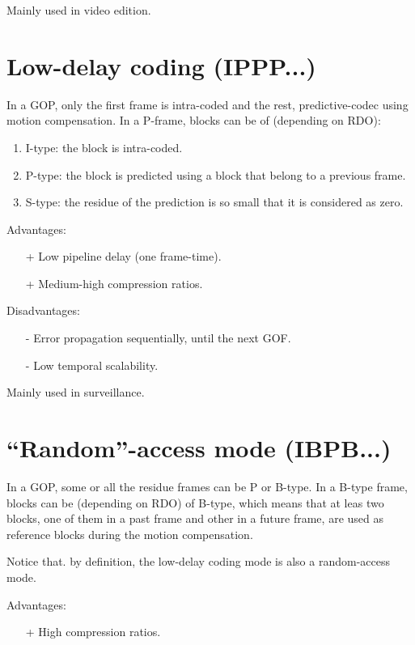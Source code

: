 Mainly used in video edition.

\section{Low-delay coding (IPPP...)}

In a GOP, only the first frame is intra-coded and the rest,
predictive-codec using motion compensation. In a P-frame, blocks can
be of (depending on RDO):
\begin{enumerate}
\item I-type: the block is intra-coded.
\item P-type: the block is predicted using a block that belong to a previous frame.
\item S-type: the residue of the prediction is so small that it is considered as zero.
\end{enumerate}

Advantages:
\begin{itemize}
\item [+] Low pipeline delay (one frame-time).
\item [+] Medium-high compression ratios.
\end{itemize}

Disadvantages:
\begin{enumerate}
\item [-] Error propagation sequentially, until the next GOF.
\item [-] Low temporal scalability.
\end{enumerate}

Mainly used in surveillance.

\section{``Random''-access mode (IBPB...)}

In a GOP, some or all the residue frames can be P or B-type. In a
B-type frame, blocks can be (depending on RDO) of B-type, which means
that at leas two blocks, one of them in a past frame and other in a
future frame, are used as reference blocks during the motion
compensation.

Notice that. by definition, the low-delay coding mode is also a
random-access mode.

Advantages:
\begin{itemize}
\item [+] High compression ratios.
\end{itemize}

